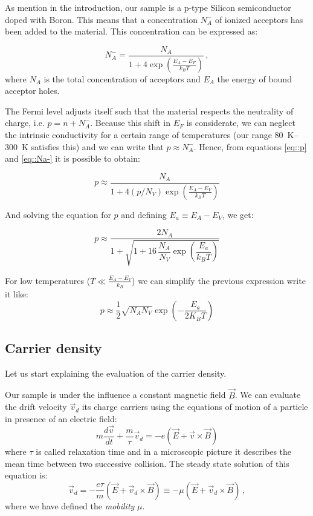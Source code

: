 \documentclass[11pt,a4paper]{article}
\begin{document}
As mention in the introduction, our sample is a p-type Silicon semiconductor doped with Boron. This means that a concentration $N_A^-$ of ionized acceptors has been added to the material. This concentration can be expressed as:

\begin{equation}\label{eq::Na-}
N_A^-=\frac{N_A}{1+4\exp\left(\frac{E_A-E_F}{k_BT}\right)}\,,
\end{equation}
where $N_A$ is the total concentration of acceptors and $E_A$ the energy of bound acceptor holes.

The Fermi level adjusts itself such that the material respects the neutrality of charge, i.e. $p=n+N_A^-$. Because this shift in $E_F$ is considerate, we can neglect the intrinsic conductivity for a certain range of temperatures (our range \SIrange{80}{300}{\kelvin} satisfies this) and we can write that $p\approx N_A^-$. Hence, from equations \eqref{eq::p} and \eqref{eq::Na-} it is possible to obtain:

\begin{equation*}
p\approx\frac{N_A}{1+4(p/N_V)\exp\left(\frac{E_A-E_V}{k_BT}\right)}
\end{equation*}

And solving the equation for $p$ and defining $E_a\equiv E_A-E_V$, we get:

\begin{equation}\label{eq:p_final}
p\approx\frac{2N_A}{1+\sqrt{1+16\,\dfrac{N_A}{N_V}\exp\left(\dfrac{E_a}{k_BT}\right)}}
\end{equation}

For low temperatures ($T\ll\frac{E_A-E_V}{k_B}$) we can simplify the previous expression write it like:
\begin{equation}\label{eq:p_final_approx}
p\approx \frac{1}{2}\sqrt{N_AN_V}\exp\left(-\frac{E_a}{2K_BT}\right)
\end{equation}

\subsection{Carrier density}
Let us start explaining the evaluation of the carrier density.

Our sample is under the influence a constant magnetic field $\vec{B}$. We can evaluate the drift velocity $\vec{v}_d$ its charge carriers using the equations of motion of a particle in presence of an electric field:
\begin{equation*}
m\frac{d\vec{v}}{dt}+\frac{m}{\tau}\vec{v}_d=-e(\vec{E}+\vec{v}\times\vec{B})
\end{equation*}
where $\tau$ is called relaxation time and in a microscopic picture it describes the mean time between two successive collision. The steady state solution of this equation is: 
\begin{equation*}
\vec{v}_d=-\frac{e\tau}{m}(\vec{E}+\vec{v}_d\times\vec{B})\equiv -\mu (\vec{E}+\vec{v}_d\times\vec{B})\,,
\end{equation*}
where we have defined the \emph{mobility} $\mu$.
\end{document}
